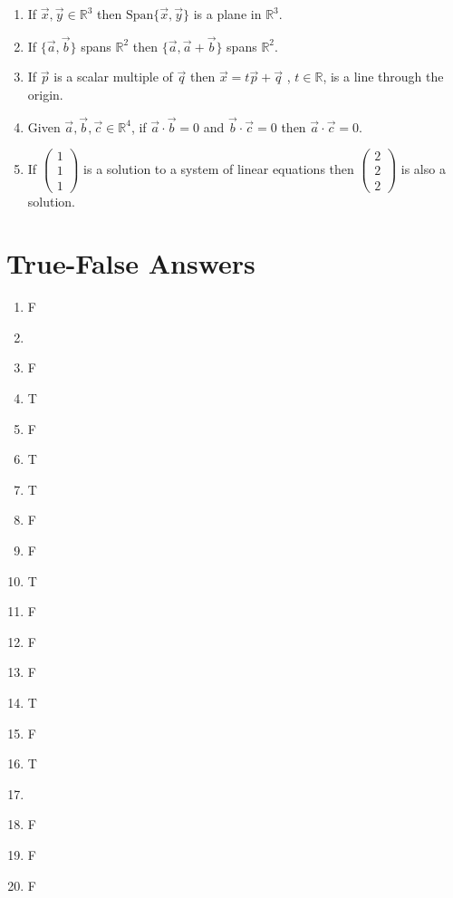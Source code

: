 \documentclass[12pt]{book}
\begin{document}
\begin{enumerate}
\begin{enumerate}
\item If $\vec{x}, \vec{y} \in \mathbb{R}^3$ then $\textrm{Span}\{ \vec{x}, \vec{y}\}$ is a plane in $\mathbb{R}^3$.
\item If $\{ \vec{a}, \vec{b} \}$ spans $\mathbb{R}^2$ then $\{ \vec{a}, \vec{a}+\vec{b} \}$ spans $\mathbb{R}^2$.
\item If $\vec{p}$ is a scalar multiple of $\vec{q}$ then $\vec{x} = t \vec{p} + \vec{q}$ , $t \in \mathbb{R}$, is a line through the origin.
\item Given $\vec{a}, \vec{b}, \vec{c} \in \mathbb{R}^4$, if $\vec{a} \cdot \vec{b} = 0$ and $\vec{b} \cdot \vec{c} = 0$ then $\vec{a} \cdot \vec{c} = 0$. 
\item If $\left(\begin{smallmatrix} 1 \\ 1 \\ 1 \end{smallmatrix}\right)$ is a solution to a system of linear equations then $\left(\begin{smallmatrix} 2 \\ 2 \\ 2 \end{smallmatrix}\right)$ is also a solution. 
\end{enumerate}

\newpage

\section*{True-False Answers}

\begin{enumerate}
\item F
\item
\item F
\item T
\item F
\item T
\item T
\item F
\item F
\item T
\item F
\item F
\item F
\item T
\item F
\item T
\item
\item F
\item F
\item F
\end{enumerate}


\end{enumerate}
\end{document}
